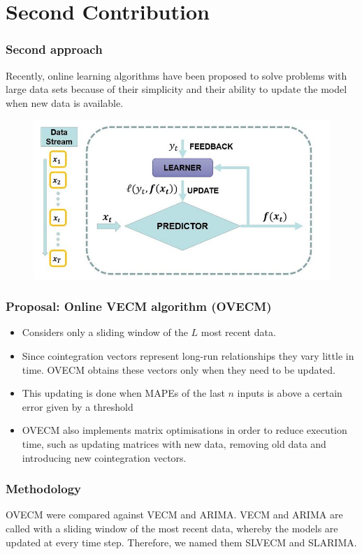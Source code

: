 \documentclass{beamer}
\begin{document}
\section{Second Contribution}

\begin{frame}
\frametitle{Second approach}
 Recently, online learning algorithms have been proposed to solve problems with large data sets because of their simplicity and their ability to update the model when new data is
available.
\begin{figure}
\includegraphics[width=0.6\paperwidth]{img/onlinelearning}
\end{figure} 
\end{frame}


\begin{frame}
\frametitle{Proposal: Online VECM algorithm (OVECM)}
\begin{itemize}
\item Considers only a sliding window of the $L$ most recent data. 
\item Since cointegration vectors represent long-run relationships they vary
little in time. OVECM obtains these vectors only when they need to be updated. 
\item This updating is done when MAPEs of the last $n$ inputs is above a certain
error given by a threshold 
\item OVECM also implements matrix optimisations in order to reduce execution time,
such as updating matrices with new data, removing old data and introducing new
cointegration vectors.
\end{itemize}
\end{frame}

\begin{frame}
\frametitle{Methodology}
OVECM were compared against VECM and ARIMA. VECM and ARIMA are called with a
sliding window of the most recent data, whereby the models are updated at every
time step. Therefore, we named them SLVECM and SLARIMA.
\end{frame}
\end{document}
